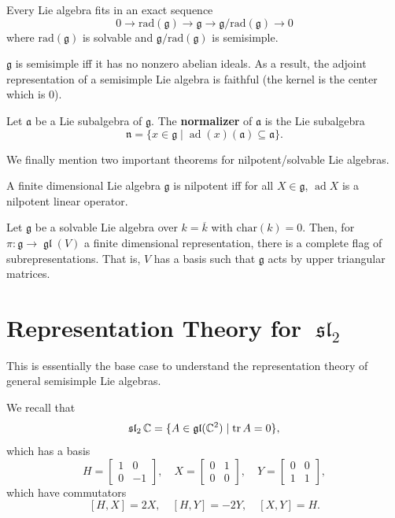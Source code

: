 \documentclass[12pt]{article}
\newcommand{\fg}{\mathfrak{g}}
\newcommand{\gl}{\operatorname{\mathfrak{gl}}}
\newcommand{\rad}{\mathrm{rad}}
\newcommand{\fa}{\mathfrak{a}}
\newcommand{\fn}{\mathfrak{n}}
\DeclareMathOperator{\ad}{ad}
\newcommand{\fsl}{\operatorname{\mathfrak{sl}}}
\DeclareMathOperator{\tr}{tr}
\begin{document}
\begin{cor}
    Every Lie algebra fits in an exact sequence
    \[0 \to \rad(\fg) \to \fg \to \fg/\rad(\fg) \to 0\]
    where $\rad(\fg)$ is solvable and $\fg/\rad(\fg)$ is semisimple.
\end{cor}

\begin{cor}
    $\fg$ is semisimple iff it has no nonzero abelian ideals. As a result, the adjoint representation of a semisimple Lie algebra is faithful (the kernel is the center which is 0).
\end{cor}

\begin{defn}
    Let $\fa$ be a Lie subalgebra of $\fg$. The \textbf{normalizer} of $\fa$ is the Lie subalgebra
    \[\fn = \{x\in \fg \mid \ad(x)(\fa) \subseteq \fa\}.\]
\end{defn}

We finally mention two important theorems for nilpotent/solvable Lie algebras.

\begin{thm}
    A finite dimensional Lie algebra $\fg$ is nilpotent iff for all $X\in \fg$, $\ad X$ is a nilpotent linear operator.
\end{thm}

\begin{thm}
    Let $\fg$ be a solvable Lie algebra over $k=\overline{k}$ with $\mathrm{char}(k) = 0$. Then, for $\pi: \fg \to \gl(V)$ a finite dimensional representation, there is a complete flag of subrepresentations. That is, $V$ has a basis such that $\fg$ acts by upper triangular matrices.
\end{thm}


\section{Representation Theory for $\fsl_2$}

This is essentially the base case to understand the representation theory of general semisimple Lie algebras.

We recall that
\[\fsl_2\C = \{A\in \gl(\C^2) \mid \tr A = 0\},\]
which has a basis
\[H = \begin{bmatrix}
    1 & 0\\
    0 & -1
\end{bmatrix}, \quad X = \begin{bmatrix}
    0 & 1\\
    0 & 0
\end{bmatrix}, \quad Y = \begin{bmatrix}
    0 & 0\\
    1 & 1
\end{bmatrix},\]
which have commutators
\[[H,X]=2X, \quad [H,Y]=-2Y, \quad [X,Y] = H.\]
\end{document}
